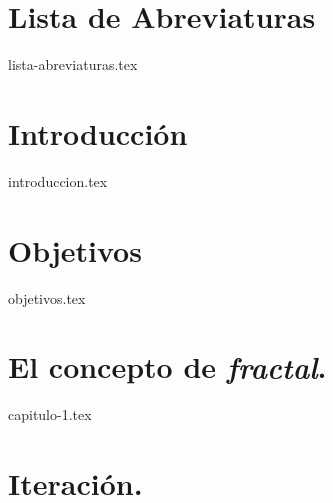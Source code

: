 \documentclass[twoside,openright,11pt]{report}
\begin{document}

\tableofcontents
\thispagestyle{plain}



\chapter*{Lista de Abreviaturas}

{lista-abreviaturas.tex}

\listoffigures
\thispagestyle{plain}



\chapter*{Introducción}


{introduccion.tex}

\chapter*{Objetivos}
\label{chap:Objetivos}

{objetivos.tex}

\chapter{El concepto de \textit{fractal}.}
\label{chap:concepto}

{capitulo-1.tex}

\chapter{Iteración.}
\label{chap:iteracion}
\end{document}
